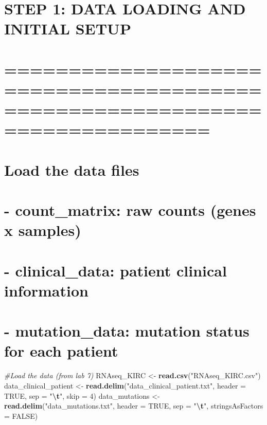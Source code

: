 \documentclass[
]{article}
\newenvironment{Shaded}{\begin{snugshade}}{\end{snugshade}}
\newcommand{\AttributeTok}[1]{\textcolor[rgb]{0.13,0.29,0.53}{#1}}
\newcommand{\CommentTok}[1]{\textcolor[rgb]{0.56,0.35,0.01}{\textit{#1}}}
\newcommand{\ConstantTok}[1]{\textcolor[rgb]{0.56,0.35,0.01}{#1}}
\newcommand{\DecValTok}[1]{\textcolor[rgb]{0.00,0.00,0.81}{#1}}
\newcommand{\FunctionTok}[1]{\textcolor[rgb]{0.13,0.29,0.53}{\textbf{#1}}}
\newcommand{\NormalTok}[1]{#1}
\newcommand{\OtherTok}[1]{\textcolor[rgb]{0.56,0.35,0.01}{#1}}
\newcommand{\SpecialCharTok}[1]{\textcolor[rgb]{0.81,0.36,0.00}{\textbf{#1}}}
\newcommand{\StringTok}[1]{\textcolor[rgb]{0.31,0.60,0.02}{#1}}
\begin{document}
\section{STEP 1: DATA LOADING AND INITIAL
SETUP}\label{step-1-data-loading-and-initial-setup}

\section{============================================================================}\label{section-4}

\section{Load the data files}\label{load-the-data-files}

\section{- count\_matrix: raw counts (genes x
samples)}\label{count_matrix-raw-counts-genes-x-samples}

\section{- clinical\_data: patient clinical
information}\label{clinical_data-patient-clinical-information}

\section{- mutation\_data: mutation status for each
patient}\label{mutation_data-mutation-status-for-each-patient}

\begin{Shaded}
\begin{Highlighting}[]
\CommentTok{\#Load the data (from lab 7)}
\NormalTok{RNAseq\_KIRC }\OtherTok{\textless{}{-}} \FunctionTok{read.csv}\NormalTok{(}\StringTok{"RNAseq\_KIRC.csv"}\NormalTok{)}
\NormalTok{data\_clinical\_patient }\OtherTok{\textless{}{-}} \FunctionTok{read.delim}\NormalTok{(}\StringTok{"data\_clinical\_patient.txt"}\NormalTok{, }\AttributeTok{header =} \ConstantTok{TRUE}\NormalTok{, }\AttributeTok{sep =} \StringTok{"}\SpecialCharTok{\textbackslash{}t}\StringTok{"}\NormalTok{, }\AttributeTok{skip =} \DecValTok{4}\NormalTok{)}
\NormalTok{data\_mutations }\OtherTok{\textless{}{-}} \FunctionTok{read.delim}\NormalTok{(}\StringTok{"data\_mutations.txt"}\NormalTok{, }\AttributeTok{header =} \ConstantTok{TRUE}\NormalTok{, }\AttributeTok{sep =} \StringTok{"}\SpecialCharTok{\textbackslash{}t}\StringTok{"}\NormalTok{, }\AttributeTok{stringsAsFactors =} \ConstantTok{FALSE}\NormalTok{)}
\end{Highlighting}
\end{Shaded}
\end{document}
